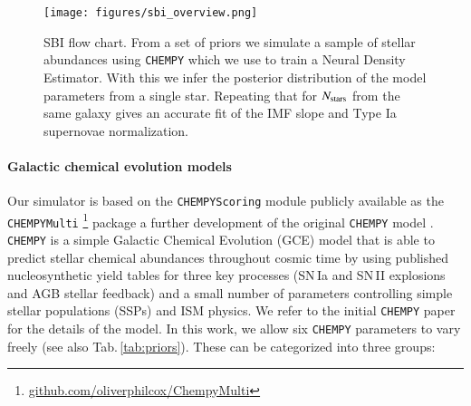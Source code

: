 \documentclass{aa}
\begin{document}
\begin{figure}[]
     \centering
     \vspace{-.25cm}
     \texttt{[image: figures/sbi\_overview.png]}
     \vspace{-.7cm}
     \caption{SBI flow chart. From a set of priors we simulate a sample of stellar abundances using \texttt{CHEMPY} which we use to train a Neural Density Estimator. With this we infer the posterior distribution of the model parameters from a single star. Repeating that for $N_{\rm stars}$ from the same galaxy gives an accurate fit of the IMF slope and Type Ia supernovae normalization.}
     \label{fig:flowchart}
\end{figure}


\paragraph{Galactic chemical evolution models}
Our simulator is based on the \texttt{CHEMPYScoring} module \citep{Philcox_2018} publicly available as the \texttt{CHEMPYMulti} \citep{Philcox_2019}\footnote{\href{https://github.com/oliverphilcox/ChempyMulti}{github.com/oliverphilcox/ChempyMulti}} package a further development of the original \texttt{CHEMPY} model \citep{Rybizki_2017}. \texttt{CHEMPY} is a simple Galactic Chemical Evolution (GCE) model that is able to predict stellar chemical abundances throughout cosmic time by using published nucleosynthetic yield tables for three key processes (SN\,Ia and SN\,II explosions and AGB stellar feedback) and a small number of parameters controlling simple stellar populations (SSPs) and ISM physics. We refer to the initial \texttt{CHEMPY} paper \citep{Rybizki_2017} for the details of the model.
In this work, we allow six \texttt{CHEMPY} parameters to vary freely (see also Tab.\,\ref{tab:priors}). These can be categorized into three groups:
\vspace{-1em}
\end{document}
